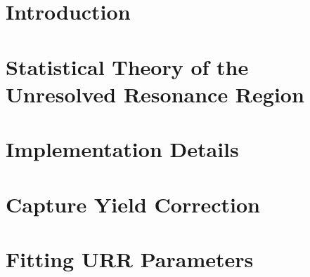 \documentclass{thesis}
\author{Alec William Golas}
\begin{document}
 
\titlepage             %
\tableofcontents       %
\listoftables          %
\listoffigures         %


\chapter{Introduction}
\label{chap:introduction}


\chapter{Statistical Theory of the Unresolved Resonance Region}
\label{chap:theory}


\chapter{Implementation Details}
\label{chap:implementation}


% 

\chapter{Capture Yield Correction}
\label{chap:capture-yield-correction}


\chapter{Fitting URR Parameters}
\label{chap:fitting}


% 

% 
\end{document}

